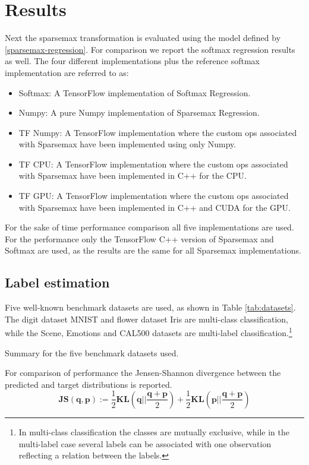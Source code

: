 \section{Results}
Next the sparsemax transformation is evaluated using the model defined by \eqref{sparsemax-regression}. For comparison we report the softmax regression results as well. The four different implementations plus the reference softmax implementation are referred to as:
\begin{itemize}
\setlength\itemsep{-0.3em}
\item Softmax: A TensorFlow implementation of Softmax Regression.
\item Numpy: A pure Numpy implementation of Sparsemax Regression.
\item TF Numpy: A TensorFlow implementation where the custom ops associated with Sparsemax have been implemented using only Numpy.
\item TF CPU: A TensorFlow implementation where the custom ops associated with Sparsemax have been implemented in C++ for the CPU.
\item TF GPU: A TensorFlow implementation where the custom ops associated with Sparsemax have been implemented in C++ and CUDA for the GPU.
\end{itemize}
For the sake of time performance comparison all five implementations are used. For the performance only the TensorFlow C++ version of Sparsemax and Softmax are used, as the results are the same for all Sparsemax implementations.

\subsection{Label estimation}
Five well-known benchmark datasets are used, as shown in Table \ref{tab:datasets}. The digit dataset MNIST and flower dataset Iris are multi-class classification, while the Scene, Emotions and CAL500 datasets are multi-label classification.\footnote{In multi-class classification the classes are mutually exclusive, while in the multi-label case several labels can be associated with one observation reflecting a relation between the labels.} 
\begin{table}[H]
\centering

\caption{Summary for the five benchmark datasets used.}
\label{tab:datasets}
\end{table}
For comparison of performance the Jensen-Shannon divergence between the predicted and target distributions is reported.
\begin{equation*}
\mathbf{JS(q,p)}:=\frac{1}{2}\mathbf{KL}\left(\mathbf{q}\Big|\Big|\frac{\mathbf{q}+\mathbf{p}}{2}\right)+\frac{1}{2}\mathbf{KL}\left(\mathbf{p}\Big|\Big|\frac{\mathbf{q}+\mathbf{p}}{2}\right)
\end{equation*}

